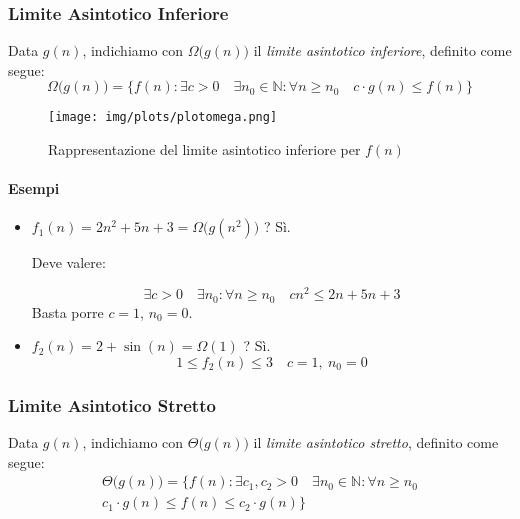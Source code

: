 \newpage
\subsubsection{Limite Asintotico Inferiore}
Data $g(n)$, indichiamo con $\Omega \big(g(n) \big)$ il \emph{limite asintotico inferiore}, definito come segue:
\begin{displaymath}
	\Omega \big(g(n) \big) = \{ f(n) : \exists c > 0 \quad \exists n_0 \in \mathbb{N} : \forall n \geq n_0 \quad c \cdot g(n) \leq f(n) \}
\end{displaymath}

\begin{figure}[!htb]
	\centering
	\texttt{[image: img/plots/plotomega.png]}
	\caption{Rappresentazione del limite asintotico inferiore per $f(n)$}
\end{figure}

\paragraph{Esempi}
\begin{itemize}
	\item $f_1(n) = 2n^2 + 5n + 3 = \Omega \big(g(n^2) \big)$ ? Sì.\par
	Deve valere: \par
	\begin{displaymath}
		\exists c > 0 \quad \exists n_0 : \forall n \geq n_0 \quad cn^2 \leq 2n + 5n + 3
	\end{displaymath}
	Basta porre $c = 1$, $n_0 = 0$.
	
	\item $f_2(n) = 2 + \sin (n) = \Omega (1)$ ? Sì.
	\begin{displaymath}
		1 \leq f_2(n) \leq 3 \quad c = 1, \ n_0 = 0
	\end{displaymath}
\end{itemize}

\subsubsection{Limite Asintotico Stretto}
Data $g(n)$, indichiamo con $\Theta \big( g(n) \big)$ il \emph{limite asintotico stretto}, definito come segue:
\begin{multline*}
	\Theta \big( g(n) \big) = \{ f(n) : \exists c_1, c_2 > 0 \quad \exists n_0 \in \mathbb{N} : \forall n \geq n_0 \\ 
	c_1 \cdot g(n) \leq f(n) \leq c_2 \cdot g(n) \}
\end{multline*}

